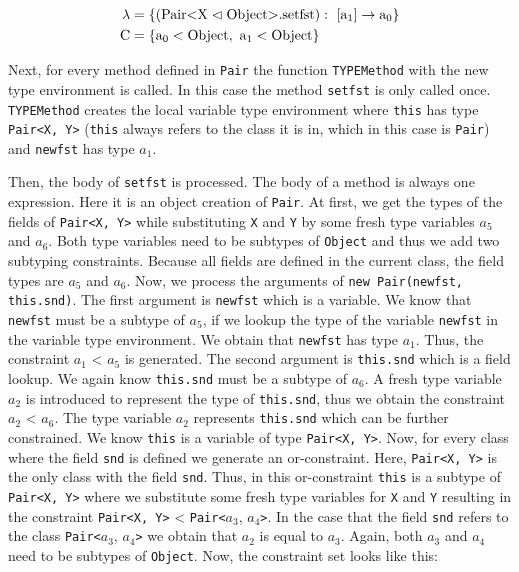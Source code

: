 \begin{align*}
    \lambda &= \{ ( \text{Pair} \text{<} \text{X} \vartriangleleft \text{Object} \text{>}. \text{setfst} ): \ [\text{a}_1] \to \text{a}_0 \}\\
    \text{C} &= \{ \text{a}_0 < \text{Object}, \ \text{a}_1 < \text{Object} \}\\
\end{align*}

Next, for every method defined in \verb|Pair| the function \verb|TYPEMethod| with the new type environment is called.
In this case the method \verb|setfst| is only called once. \verb|TYPEMethod| creates the local variable type environment where \verb|this| has type \verb|Pair<X, Y>| (\verb|this| always refers to the class it is in, which in this case is \verb|Pair|) and \verb|newfst| has type $a_1$.

Then, the body of \verb|setfst| is processed. The body of a method is always one expression. Here it is an object creation of \verb|Pair|.
At first, we get the types of the fields of \verb|Pair<X, Y>| while substituting \verb|X| and \verb|Y| by some fresh type variables $a_5$ and $a_6$. Both type variables need to be subtypes of \verb|Object| and thus we add two subtyping constraints. Because all fields are defined in the current class, the field types are $a_5$ and $a_6$. Now, we process the arguments of \verb|new Pair(newfst, this.snd)|.
The first argument is \verb|newfst| which is a variable. We know that \verb|newfst| must be a subtype of $a_5$, if we lookup the type of the variable \verb|newfst| in the variable type environment. We obtain that \verb|newfst| has type $a_1$. Thus, the constraint $a_1$ < $a_5$ is generated.
The second argument is \verb|this.snd| which is a field lookup. We again know \verb|this.snd| must be a subtype of $a_6$. A fresh type variable $a_2$ is introduced to represent the type of \verb|this.snd|, thus we obtain the constraint $a_2$ < $a_6$.
The type variable $a_2$ represents \verb|this.snd| which can be further constrained. We know \verb|this| is a variable of type \verb|Pair<X, Y>|.
Now, for every class where the field \verb|snd| is defined we generate an or-constraint. Here, \verb|Pair<X, Y>| is the only class with the field \verb|snd|. Thus, in this or-constraint \verb|this| is a subtype of \verb|Pair<X, Y>| where we substitute some fresh type variables for \verb|X| and \verb|Y| resulting in the constraint \verb|Pair<X, Y>| < \verb|Pair<|$a_3$, $a_4$\verb|>|.
In the case that the field \verb|snd| refers to the class \verb|Pair<|$a_3$, $a_4$\verb|>| we obtain that $a_2$ is equal to $a_3$. Again, both $a_3$ and $a_4$ need to be subtypes of \verb|Object|.
Now, the constraint set looks like this:

